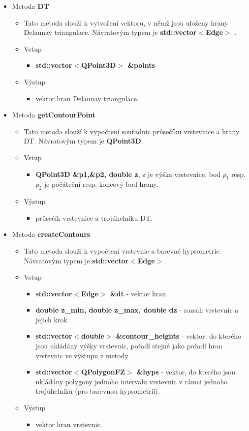 \documentclass[a4paper, 12pt]{article}
\begin{document}
\begin{itemize}
	\item Metoda \textbf{DT}		
\begin{itemize}
	\item Tato metoda slouží k vytvoření vektoru, v němž jsou uloženy hrany Delaunay triangulace. Návratovým typem je \textbf{std::vector$<$Edge$>$ }.
	\item Vstup
	\begin{itemize}
		\item \textbf{std::vector$<$QPoint3D$>$ \&points} 
	\end{itemize}
	\item Výstup
	\begin{itemize}	
		\item vektor hran Delaunay triangulace.
	\end{itemize}
\end{itemize}

	\item Metoda \textbf{getContourPoint}		
\begin{itemize}
	\item Tato metoda slouží k vypočtení souřadnic průsečíku vrstevnice a hrany DT. Návratovým typem je \textbf{QPoint3D}.
	\item Vstup
	\begin{itemize}
		\item \textbf{QPoint3D \&p1,\&p2, double z}, z je výška vrstevnice, bod $p_1$ resp. $p_2$ je počáteční resp. koncový bod hrany.
	\end{itemize}
	\item Výstup
	\begin{itemize}	
		\item průsečík vrstevnice a trojúhelníku DT.
	\end{itemize}
\end{itemize}

	\item Metoda \textbf{createContours}		
\begin{itemize}
	\item Tato metoda slouží k vypočtení vrstevnic a barevné hypsometrie. Návratovým typem je \textbf{std::vector$<$Edge$>$}.
	\item Vstup
	\begin{itemize}
		\item \textbf{std::vector$<$Edge$>$ \&dt} - vektor hran
		\item \textbf{double z\_min, double z\_max, double dz} - rozsah vrstevnic a jejich krok
		\item \textbf{std::vector$<$double$>$ \&contour\_heights} - vektor, do kterého jsou ukládány výšky vrstevnic, pořadí stejné jako pořadí hran vrstevnic ve výstupu z metody
		\item \textbf{std::vector$<$QPolygonFZ$>$ \&hyps} - vektor, do kterého jsou ukládány polygony jednoho intervalu vrstevnic v rámci jednoho trojúhelníku (pro barevnou hypsometrii). 
	\end{itemize}
	\item Výstup
	\begin{itemize}	
		\item vektor hran vrstevnic.
	\end{itemize}
\end{itemize}


\end{itemize}
\end{document}
